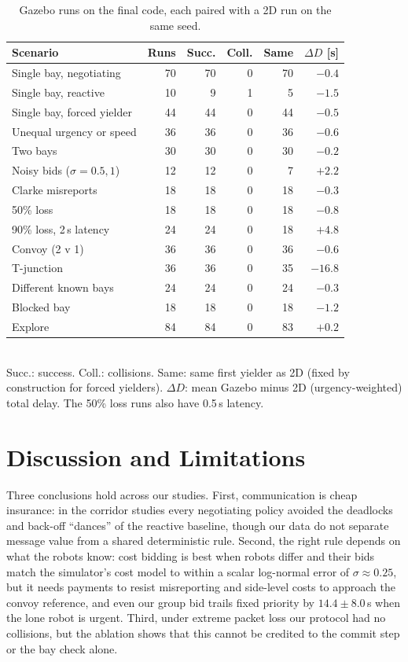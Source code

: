 \documentclass[letterpaper,journal]{IEEEtran}
\begin{document}
\begin{table}[t]\centering
\caption{Gazebo runs on the final code, each paired with a 2D run on the same seed.}
\label{tab:gz}
{\footnotesize\setlength{\tabcolsep}{4pt}
\begin{tabular}{@{}lrrrrr@{}}\toprule
Scenario & Runs & Succ. & Coll. & Same & $\Delta D$ [s]\\\midrule
Single bay, negotiating & 70 & 70 & 0 & 70 & $-0.4$\\
Single bay, reactive & 10 & 9 & 1 & 5 & $-1.5$\\
Single bay, forced yielder & 44 & 44 & 0 & 44 & $-0.5$\\
Unequal urgency or speed & 36 & 36 & 0 & 36 & $-0.6$\\
Two bays & 30 & 30 & 0 & 30 & $-0.2$\\
Noisy bids ($\sigma=0.5,1$) & 12 & 12 & 0 & 7 & $+2.2$\\
Clarke misreports & 18 & 18 & 0 & 18 & $-0.3$\\
50\% loss & 18 & 18 & 0 & 18 & $-0.8$\\
90\% loss, 2\,s latency & 24 & 24 & 0 & 18 & $+4.8$\\
Convoy (2 v 1) & 36 & 36 & 0 & 36 & $-0.6$\\
T-junction & 36 & 36 & 0 & 35 & $-16.8$\\
Different known bays & 24 & 24 & 0 & 24 & $-0.3$\\
Blocked bay & 18 & 18 & 0 & 18 & $-1.2$\\
Explore & 84 & 84 & 0 & 83 & $+0.2$\\\bottomrule
\end{tabular}}\\[2pt]
{\footnotesize Succ.: success. Coll.: collisions. Same: same first yielder as 2D (fixed by construction for forced yielders). $\Delta D$: mean Gazebo minus 2D (urgency-weighted) total delay. The 50\% loss runs also have 0.5\,s latency.}
\end{table}

\section{Discussion and Limitations}
Three conclusions hold across our studies. First, communication is cheap insurance: in the corridor studies every negotiating policy avoided the deadlocks and back-off ``dances'' of the reactive baseline, though our data do not separate message value from a shared deterministic rule. Second, the right rule depends on what the robots know: cost bidding is best when robots differ and their bids match the simulator's cost model to within a scalar log-normal error of $\sigma\approx0.25$, but it needs payments to resist misreporting and side-level costs to approach the convoy reference, and even our group bid trails fixed priority by $14.4\pm8.0$\,s when the lone robot is urgent. Third, under extreme packet loss our protocol had no collisions, but the ablation shows that this cannot be credited to the commit step or the bay check alone.
\end{document}
